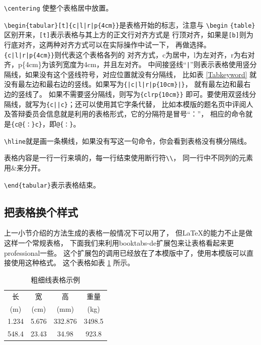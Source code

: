 \verb+\centering+ 使整个表格居中放置。

\verb+\begin{tabular}[t]{c|l|r|p{4cm}}+是表格开始的标志，注意与
\verb+\begin+ \verb+{table}+区别开来，\verb+[t]+表示表格与其上方的正文行对齐方式是
行顶对齐，如果是\verb+[b]+则为行底对齐，这两种对齐方式可以在实际操作中试一下，
再做选择。\verb+{c|l|r|p{4cm}}+则代表这个表格各列的
对齐方式，c为居中，l为左对齐，r为右对齐，p\{4cm\}为该列宽度为4cm，并且左对齐。
中间接竖线“\verb+|+”则表示表格使用竖分隔线，如果没有这个竖线符号，对应位置就没有分隔线，
比如表 \ref{Tabkeyword} 就没有最左边和最右边的竖线。如果写为\verb+{|c|l|r|p{10cm}|}+，
就有最左边和最右边的竖线了。
如果不需要竖分隔线，则写为\verb+{clrp{10cm}}+
即可。要使用双竖线分隔线，就写为\verb+{c||c}+；还可以使用其它字条代替，
比如本模版的题名页中评阅人及答辩委员会信息就是利用的表格形式，它的分隔符是冒号“：”，
相应的命令就是\verb+{c@{：}c}+，即\verb+@{：}+。

\verb+\hline+就是画一条横线，如果没有写这一句命令，你会看到表格没有横分隔线。

表格内容是一行一行来填的，每一行结束使用断行符\verb+\\+，
同一行中不同列的元素用\&来分开。

\verb+\end{tabular}+表示表格结束。

\subsection{把表格换个样式}

上一小节介绍的方法生成的表格一般情况下可以用了，
但\LaTeX 的能力不止是做这样一个常规表格，
下面我们来利用booktabs-de扩展包来让表格看起来更professional一些。
这个扩展包的调用已经放在了本模版中了，使用本模版可以直接使用这种格式。
这个表格如表 \ref{Tab3Line} 所示。

{
\linespread{1}
\begin{table}[htb]
\caption{粗细线表格示例}
\label{Tab3Line}
\centering
\begin{tabular}[b]{cccc}
\toprule
长 & 宽 & 高 & 重量\\
(m) & (cm) & (mm) & (kg)\\
\toprule
1.234 & 5.676 & 332.876 & 3498.5\\
\midrule
548.4 & 23.43 & 34.98 & 923.8\\
\bottomrule
\end{tabular}
\end{table}
}

